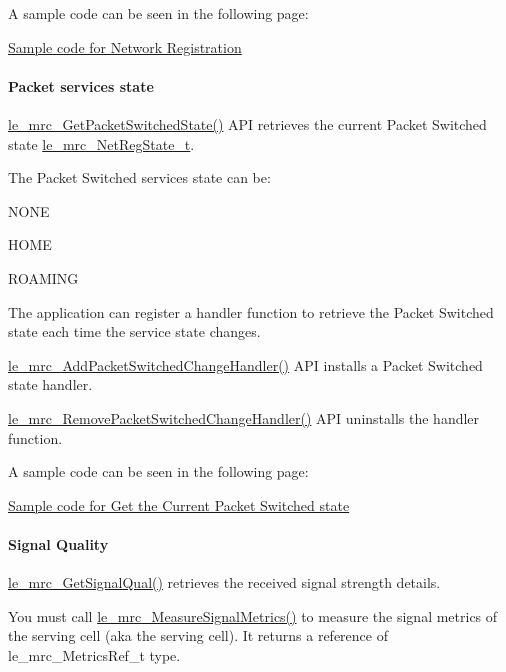 A sample code can be seen in the following page\+:
\begin{DoxyItemize}
\item \hyperlink{c_mrcNetworkRegistration}{Sample code for Network Registration}
\end{DoxyItemize}\hypertarget{c_mrc_le_mrc_service}{}\paragraph{Packet services state}\label{c_mrc_le_mrc_service}
\hyperlink{le__mrc__interface_8h_a2be4a96c3dfd80a63832203f22a661bb}{le\+\_\+mrc\+\_\+\+Get\+Packet\+Switched\+State()} A\+PI retrieves the current Packet Switched state \hyperlink{le__mrc__interface_8h_ae2877a1e1252ac79e6c9cae3d3c25a61}{le\+\_\+mrc\+\_\+\+Net\+Reg\+State\+\_\+t}.

The Packet Switched services state can be\+:
\begin{DoxyItemize}
\item N\+O\+NE
\item H\+O\+ME
\item R\+O\+A\+M\+I\+NG
\end{DoxyItemize}

The application can register a handler function to retrieve the Packet Switched state each time the service state changes.

\hyperlink{le__mrc__interface_8h_ad407c67e0e2bd3d040e2cbbc6338ec2e}{le\+\_\+mrc\+\_\+\+Add\+Packet\+Switched\+Change\+Handler()} A\+PI installs a Packet Switched state handler.

\hyperlink{le__mrc__interface_8h_a77a657cf71ac533bd8da6772348fc04f}{le\+\_\+mrc\+\_\+\+Remove\+Packet\+Switched\+Change\+Handler()} A\+PI uninstalls the handler function.

A sample code can be seen in the following page\+:
\begin{DoxyItemize}
\item \hyperlink{c_mrcGetService}{Sample code for Get the Current Packet Switched state}
\end{DoxyItemize}\hypertarget{c_mrc_le_mrc_signal}{}\paragraph{Signal Quality}\label{c_mrc_le_mrc_signal}
\hyperlink{le__mrc__interface_8h_a717aa0f4e4dc9a83b6adc2f26f3f0258}{le\+\_\+mrc\+\_\+\+Get\+Signal\+Qual()} retrieves the received signal strength details.

You must call \hyperlink{le__mrc__interface_8h_ad3662723a7ed47cf45d9a2eaaa1fb16e}{le\+\_\+mrc\+\_\+\+Measure\+Signal\+Metrics()} to measure the signal metrics of the serving cell (aka the \textquotesingle{}serving\textquotesingle{} cell). It returns a reference of le\+\_\+mrc\+\_\+\+Metrics\+Ref\+\_\+t type.

